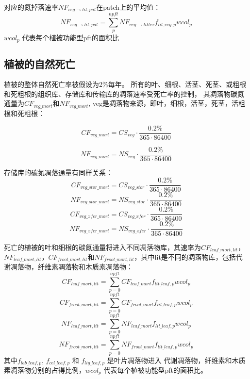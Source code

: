 对应的氮掉落速率$NF_{veg\rightarrow lit,pat}$在patch上的平均值：
\begin{equation}
  NF_{veg\rightarrow lit,pat}=\sum_{p}^{npft}{NF_{veg \rightarrow litter}f_{lit\_{veg},p}{wcol_p}}
\end{equation}
${wcol_p}$ 代表每个植被功能型pft的面积比

\subsection{植被的自然死亡}\label{植被的自然死亡}
植被的整体自然死亡率被假设为2\%每年。
所有的叶、细根、活茎、死茎、或粗根和死粗根的组织库、存储库和传输库的凋落速率受死亡率的控制，
其凋落物碳氮通量为$CF_{veg\_{mort}}$和$NF_{veg\_{mort}}$, veg是凋落物来源，即叶，细根，活茎，死茎，活粗根和死粗根： 

\begin{equation}
  CF_{veg\_{mort}}=CS_{veg}\cdot \frac{0.2\%}{365\cdot 86400}
\end{equation}

\begin{equation}
  NF_{veg\_{mort}}=NS_{veg}\cdot \frac{0.2\%}{365\cdot 86400}
\end{equation}

存储库的碳氮凋落通量有同样关系：
\begin{equation}
  CF_{veg\_{{stor}\_{mort}}}=CS_{veg\_{stor}}\cdot \frac{0.2\%}{365\cdot 86400}
\end{equation}
\begin{equation}
  NF_{veg\_{{stor}\_{mort}}}=NS_{veg\_{stor}}\cdot \frac{0.2\%}{365\cdot 86400}
\end{equation}
\begin{equation}
  CF_{veg\_{{xfer}\_{mort}}}=CS_{veg\_{xfer}}\cdot \frac{0.2\%}{365\cdot 86400}
\end{equation}
\begin{equation}
  NF_{veg\_{{xfer}\_{mort}}}=NS_{veg\_{xfer}}\cdot \frac{0.2\%}{365\cdot 86400}
\end{equation}

死亡的植被的叶和细根的碳氮通量将进入不同凋落物库，其速率为$CF_{leaf\_{mort},lit}$，$NF_{leaf\_{mort},lit}$，$CF_{froot\_{mort},lit}$和$NF_{froot\_{mort},lit}$，其中lit是不同的凋落物库，包括代谢凋落物，纤维素凋落物和木质素凋落物：
\begin{equation}
CF_{leaf\_{mort},lit}=\sum_{p=0}^{npft}{CF_{leaf\_{mort}}f_{lit\_{leaf},p}{wcol_p}}
\end{equation}
\begin{equation}
CF_{froot\_mort,lit}=\sum_{p=0}^{npft}{CF_{froot\_mort}f_{lit\_{leaf},p}{wcol_p}}
\end{equation}
\begin{equation}
NF_{leaf\_{mort},lit}=\sum_{p=0}^{npft}{NF_{leaf\_{mort}}f_{lit\_{leaf},p}{wcol_p}}
\end{equation}
\begin{equation}
  NF_{froot\_mort,lit}=\sum_{p=0}^{npft}{NF_{froot\_mort}f_{lit\_{leaf},p}{wcol_p}}
\end{equation}
其中$f_{lab\_{leaf},p}$, $f_{cel\_{leaf},p}$ 和 $f_{lig\_{leaf},p}$ 是叶片凋落物进入
代谢凋落物，纤维素和木质素凋落物分别的占得比例，${wcol_p}$ 代表每个植被功能型pft的面积比。


